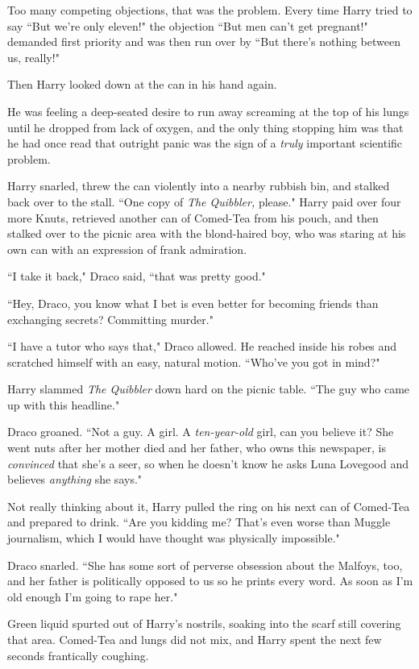 Too many competing objections, that was the problem. Every time Harry tried to say ``But we're only eleven!" the objection ``But men can't get pregnant!" demanded first priority and was then run over by ``But there's nothing between us, really!"

Then Harry looked down at the can in his hand again.

He was feeling a deep-seated desire to run away screaming at the top of his lungs until he dropped from lack of oxygen, and the only thing stopping him was that he had once read that outright panic was the sign of a \emph{truly} important scientific problem.

Harry snarled, threw the can violently into a nearby rubbish bin, and stalked back over to the stall. ``One copy of \emph{The Quibbler,} please." Harry paid over four more Knuts, retrieved another can of Comed-Tea from his pouch, and then stalked over to the picnic area with the blond-haired boy, who was staring at his own can with an expression of frank admiration.

``I take it back," Draco said, ``that was pretty good."

``Hey, Draco, you know what I bet is even better for becoming friends than exchanging secrets? Committing murder."

``I have a tutor who says that," Draco allowed. He reached inside his robes and scratched himself with an easy, natural motion. ``Who've you got in mind?"

Harry slammed \emph{The Quibbler} down hard on the picnic table. ``The guy who came up with this headline."

Draco groaned. ``Not a guy. A girl. A \emph{ten-year-old} girl, can you believe it? She went nuts after her mother died and her father, who owns this newspaper, is \emph{convinced} that she's a seer, so when he doesn't know he asks Luna Lovegood and believes \emph{anything} she says."

Not really thinking about it, Harry pulled the ring on his next can of Comed-Tea and prepared to drink. ``Are you kidding me? That's even worse than Muggle journalism, which I would have thought was physically impossible."

Draco snarled. ``She has some sort of perverse obsession about the Malfoys, too, and her father is politically opposed to us so he prints every word. As soon as I'm old enough I'm going to rape her."

Green liquid spurted out of Harry's nostrils, soaking into the scarf still covering that area. Comed-Tea and lungs did not mix, and Harry spent the next few seconds frantically coughing.


